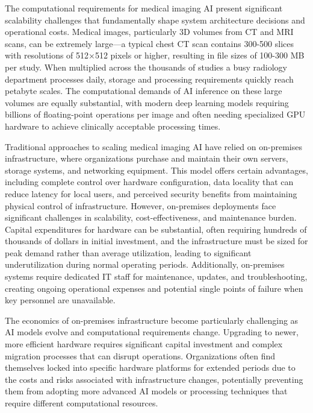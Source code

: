 \documentclass[12pt,a4paper]{article}
\begin{document}
The computational requirements for medical imaging AI present significant scalability challenges that fundamentally shape system architecture decisions and operational costs. Medical images, particularly 3D volumes from CT and MRI scans, can be extremely large—a typical chest CT scan contains 300-500 slices with resolutions of 512×512 pixels or higher, resulting in file sizes of 100-300 MB per study. When multiplied across the thousands of studies a busy radiology department processes daily, storage and processing requirements quickly reach petabyte scales. The computational demands of AI inference on these large volumes are equally substantial, with modern deep learning models requiring billions of floating-point operations per image and often needing specialized GPU hardware to achieve clinically acceptable processing times.

Traditional approaches to scaling medical imaging AI have relied on on-premises infrastructure, where organizations purchase and maintain their own servers, storage systems, and networking equipment. This model offers certain advantages, including complete control over hardware configuration, data locality that can reduce latency for local users, and perceived security benefits from maintaining physical control of infrastructure. However, on-premises deployments face significant challenges in scalability, cost-effectiveness, and maintenance burden. Capital expenditures for hardware can be substantial, often requiring hundreds of thousands of dollars in initial investment, and the infrastructure must be sized for peak demand rather than average utilization, leading to significant underutilization during normal operating periods. Additionally, on-premises systems require dedicated IT staff for maintenance, updates, and troubleshooting, creating ongoing operational expenses and potential single points of failure when key personnel are unavailable.

The economics of on-premises infrastructure become particularly challenging as AI models evolve and computational requirements change. Upgrading to newer, more efficient hardware requires significant capital investment and complex migration processes that can disrupt operations. Organizations often find themselves locked into specific hardware platforms for extended periods due to the costs and risks associated with infrastructure changes, potentially preventing them from adopting more advanced AI models or processing techniques that require different computational resources.
\end{document}
